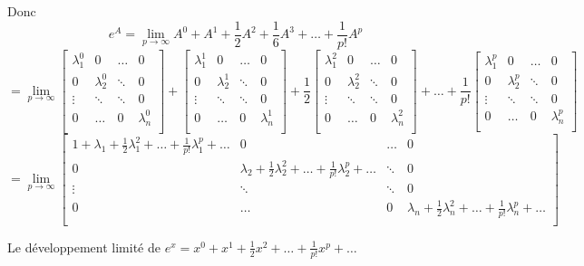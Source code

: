 \documentclass[]{book}
\theoremstyle{definition}
\begin{document}
Donc 
$$
e^A = \lim_{p \to \infty} {A^0 + A^1 + \frac{1}{2}A^2 + \frac{1}{6}A^3 + \ldots + \frac{1}{p!}A^p}
$$
$$= \lim_{p \to \infty}{
\begin{bmatrix}
    \lambda_1^0 & 0 & \ldots & 0 \\    
    0 & \lambda_2^0  & \ddots & 0 \\
    \vdots & \ddots & \ddots & 0 \\    
    0 & \ldots & 0 & \lambda_n^0\\
\end{bmatrix}
+
\begin{bmatrix}
    \lambda_1^1 & 0 & \ldots & 0 \\    
    0 & \lambda_2^1  & \ddots & 0 \\
    \vdots & \ddots & \ddots & 0 \\    
    0 & \ldots & 0 & \lambda_n^1\\
\end{bmatrix}
+
\frac{1}{2}
\begin{bmatrix}
    \lambda_1^2 & 0 & \ldots & 0 \\    
    0 & \lambda_2^2  & \ddots & 0 \\
    \vdots & \ddots & \ddots & 0 \\    
    0 & \ldots & 0 & \lambda_n^2\\
\end{bmatrix}
+
\ldots
+
\frac{1}{p!}
\begin{bmatrix}
    \lambda_1^p & 0 & \ldots & 0 \\    
    0 & \lambda_2^p  & \ddots & 0 \\
    \vdots & \ddots & \ddots & 0 \\    
    0 & \ldots & 0 & \lambda_n^p\\
\end{bmatrix}
}    
$$
$$
= 
\lim_{p \to \infty}{
\begin{bmatrix}
    1 + \lambda_1 + \frac{1}{2}\lambda_1^2 + \ldots + \frac{1}{p!}\lambda_1^p + \ldots & 0 & \ldots & 0 \\    
    0 & \lambda_2 + \frac{1}{2}\lambda_2^2 + \ldots + \frac{1}{p!}\lambda_2^p + \ldots  & \ddots & 0 \\
    \vdots & \ddots & \ddots & 0 \\    
    0 & \ldots & 0 & \lambda_n + \frac{1}{2}\lambda_n^2 + \ldots + \frac{1}{p!}\lambda_n^p + \ldots\\
\end{bmatrix}
}
$$

Le d\'eveloppement limit\'e de $e^x = x^0 + x^1 + \frac{1}{2}x^2 + \ldots + \frac{1}{p!}x^p + \ldots$
\end{document}
